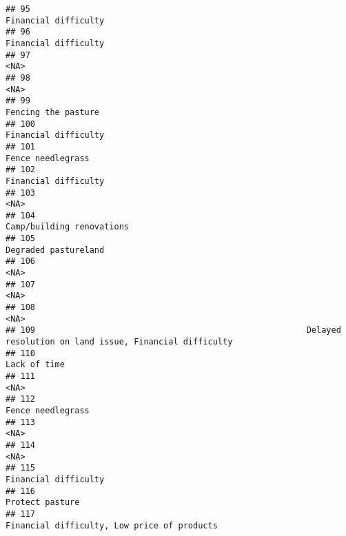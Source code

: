 \documentclass[
]{article}
\begin{document}
\begin{verbatim}
## 95                                                                                          Financial difficulty
## 96                                                                                          Financial difficulty
## 97                                                                                                          <NA>
## 98                                                                                                          <NA>
## 99                                                                                           Fencing the pasture
## 100                                                                                         Financial difficulty
## 101                                                                                            Fence needlegrass
## 102                                                                                         Financial difficulty
## 103                                                                                                         <NA>
## 104                                                                                    Camp/building renovations
## 105                                                                                         Degraded pastureland
## 106                                                                                                         <NA>
## 107                                                                                                         <NA>
## 108                                                                                                         <NA>
## 109                                                       Delayed resolution on land issue, Financial difficulty
## 110                                                                                                 Lack of time
## 111                                                                                                         <NA>
## 112                                                                                            Fence needlegrass
## 113                                                                                                         <NA>
## 114                                                                                                         <NA>
## 115                                                                                         Financial difficulty
## 116                                                                                              Protect pasture
## 117                                                                  Financial difficulty, Low price of products

\end{verbatim}
\end{document}

